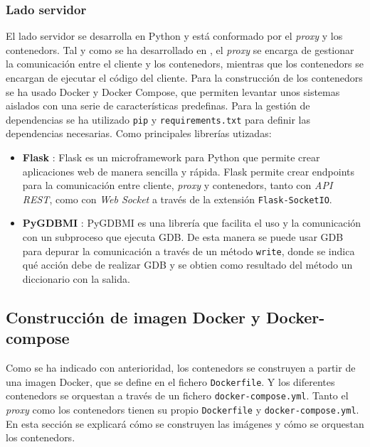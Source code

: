\subsubsection{Lado servidor}
El lado servidor se desarrolla en Python y está conformado por el \textit{\gls{proxy}} y los \glspl{contenedor}. Tal y como se ha desarrollado en , el \textit{\gls{proxy}} se encarga de gestionar la comunicación entre el cliente y los \glspl{contenedor}, mientras que los \glspl{contenedor} se encargan de ejecutar el código del cliente. 
Para la construcción de los \glspl{contenedor} se ha usado Docker y Docker Compose, que permiten levantar unos sistemas aislados con una serie de características predefinas.
Para la gestión de dependencias se ha utilizado \texttt{pip} y \texttt{requirements.txt} para definir las dependencias necesarias. 
Como principales librerías utizadas:
\begin{itemize}
    \item \textbf{Flask} \cite{flask}: Flask es un microframework para Python que permite crear aplicaciones web de manera sencilla y rápida. Flask permite crear endpoints para la comunicación entre cliente, \textit{\gls{proxy}} y \glspl{contenedor}, tanto con \textit{API REST}, como con \textit{Web Socket} a través de la extensión \texttt{Flask-SocketIO}.
    \item \textbf{PyGDBMI} \cite{pygdbmi}: PyGDBMI es una librería que facilita el uso y la comunicación con un subproceso que ejecuta GDB. De esta manera se puede usar GDB para depurar la comunicación a través de un método \texttt{write}, donde se indica qué acción debe de realizar GDB y se obtien como resultado del método un diccionario con la salida. 
\end{itemize}

\subsection{Construcción de imagen Docker y Docker-compose} \label{subsec:construccion_imagen_docker}

Como se ha indicado con anterioridad, los \glspl{contenedor} se construyen a partir de una imagen Docker, que se define en el fichero \texttt{Dockerfile}. Y los diferentes \glspl{contenedor} se orquestan a través de un fichero \texttt{docker-compose.yml}. Tanto el \textit{\gls{proxy}} como los \glspl{contenedor} tienen su propio \texttt{Dockerfile} y \texttt{docker-compose.yml}. En esta sección se explicará cómo se construyen las imágenes y cómo se orquestan los \glspl{contenedor}.

